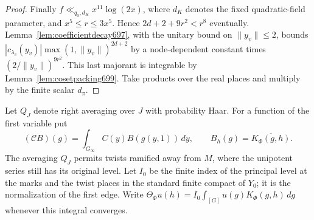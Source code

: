 \documentclass[a4paper,11pt]{article}
\theoremstyle{definition}
\theoremstyle{remark}
\numberwithin{equation}{section}
\begin{document}
\begin{proof}
Finally \(f\ll_{q_0,d_K}x^{11}\log(2x)\), where \(d_K\)
denotes the fixed quadratic-field parameter, and
\(x^5\le r\le3x^5\). Hence \(2d+2+9r^2<r^8\) eventually.
Lemma~\ref{lem:coefficientdecay697}, with the unitary bound
on \(\|y_v\|\le2\), bounds
\(|c_{\lambda_v}(y_v)|\max(1,\|y_v\|)^{2d+2}\)
by a node-dependent constant times
\((2/\|y_v\|)^{9r^2}\). This last majorant is integrable
by Lemma~\ref{lem:cosetpacking699}. Take products over the
real places and multiply by the finite scalar \(d_\pi\).
\end{proof}

Let \(Q_J\) denote right averaging over \(J\) with probability
Haar. For a function of the first variable put
\[
   (\mathcal C B)(g)=\int_{G_\infty} C(y) B(g(y,1))\,dy,
   \qquad B_h(g)=\overline{K_\Phi(g,h)} .
\]
The averaging \(Q_J\) permits twists ramified away from
\(M\), where the unipotent series still has its original
level. Let \(I_0\) be the finite index of the principal level
at the marks and the twist places in the standard finite
compact of \(Y_0\); it is the normalization of the first
edge. Write
\(\Theta_\Phi u(h)= I_0\int_{[G]}u(g)K_\Phi(g,h)\,dg\)
whenever this integral converges.
\end{document}
